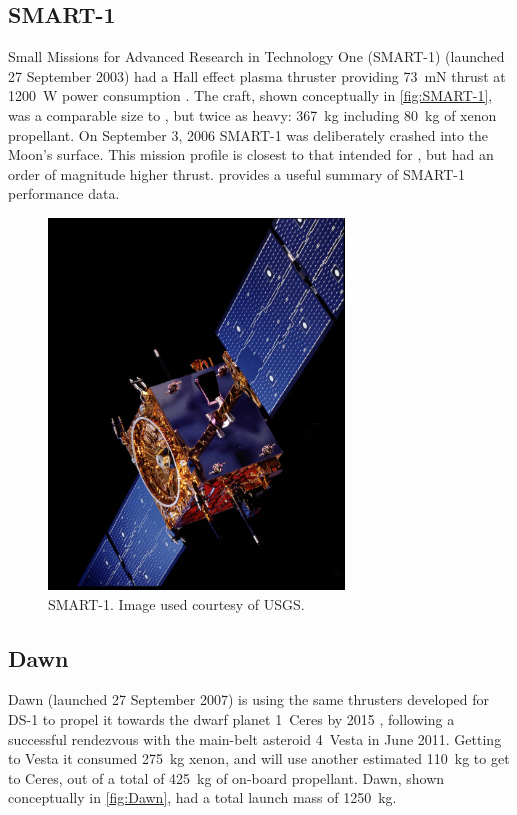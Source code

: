 \subsection{SMART-1}
Small Missions for Advanced Research in Technology One (SMART-1) (launched 27 September 2003) had a Hall effect plasma thruster providing 73~mN thrust at 1200~W power consumption \parencite{web_SMART-1}. The craft, shown conceptually in \autoref{fig:SMART-1}, was a comparable size to \BW, but twice as heavy: 367~kg including 80~kg of xenon propellant. On September 3, 2006 SMART-1 was deliberately crashed into the Moon's surface. This mission profile is closest to that intended for \BW, but had an order of magnitude higher thrust. \textcite{Estublier2007} provides a useful summary of SMART-1 performance data.

\begin{figure}[ht]
\caption{SMART-1. Image used courtesy of USGS.}
\label{fig:SMART-1}
\centering
\includegraphics [angle=90,width=0.7\textwidth] {Images/SMART-1.jpg}
\end{figure}

\subsection{Dawn}
Dawn (launched 27 September 2007) is using the same thrusters developed for DS-1 to propel it towards the dwarf planet 1~Ceres by 2015 \parencite{web_Dawn}, following a successful rendezvous with the main-belt asteroid 4~Vesta in June 2011. Getting to Vesta it consumed 275~kg xenon, and will use another estimated 110~kg to get to Ceres, out of a total of 425~kg of on-board propellant. Dawn, shown conceptually in \autoref{fig:Dawn}, had a total launch mass of 1250~kg.

